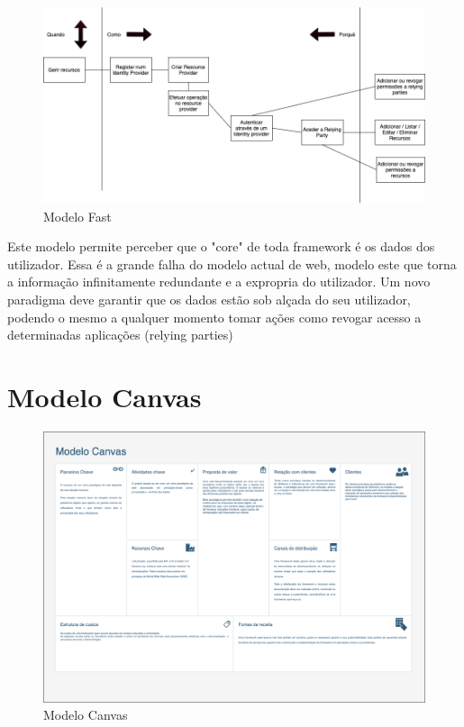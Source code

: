 \begin{figure}[h]
    \begin{center}
    \includegraphics[width=1\textwidth]{figures/Canvas-FAST.png}
    \caption{Modelo Fast}
    \end{center}
\end{figure}

Este modelo permite perceber que o "core" de toda framework é os dados dos utilizador. Essa é a grande falha do modelo actual de web, modelo este que torna a informação infinitamente redundante e a expropria do utilizador.
Um novo paradigma deve garantir que os dados estão sob alçada do seu utilizador, podendo o mesmo a qualquer momento tomar ações como revogar acesso a determinadas aplicações (relying parties)

\section{Modelo Canvas}
\begin{figure}[h]
    \begin{center}
    \includegraphics[width=1 \textwidth, angle=-90]{figures/Canvas-Canvas.png}
    \caption{Modelo Canvas}
    \end{center}
\end{figure}
